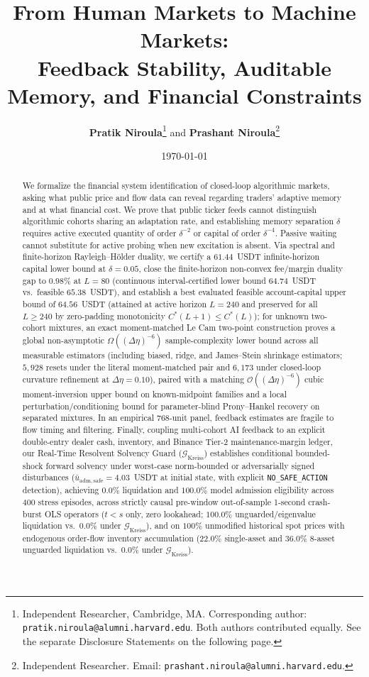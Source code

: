 \documentclass[12pt]{article}
\title{\textbf{From Human Markets to Machine Markets:}\\[0.3em]
\Large Feedback Stability, Auditable Memory, and Financial Constraints}
\author{\textbf{Pratik Niroula}\thanks{Independent Researcher, Cambridge, MA. Corresponding author: \texttt{pratik.niroula@alumni.harvard.edu}. Both authors contributed equally. See the separate Disclosure Statements on the following page.} \quad and \quad \textbf{Prashant Niroula}\thanks{Independent Researcher. Email: \texttt{prashant.niroula@alumni.harvard.edu}.}}
\date{\today}
\theoremstyle{definition}
\theoremstyle{remark}
\begin{document}
\maketitle
\thispagestyle{empty}

\vspace{-0.5em}
\begin{abstract}
\noindent We formalize the financial system identification of closed-loop algorithmic markets, asking what public price and flow data can reveal regarding traders' adaptive memory and at what financial cost. We prove that public ticker feeds cannot distinguish algorithmic cohorts sharing an adaptation rate, and establishing memory separation $\delta$ requires active executed quantity of order $\delta^{-2}$ or capital of order $\delta^{-4}$. Passive waiting cannot substitute for active probing when new excitation is absent. Via spectral and finite-horizon Rayleigh--H\"older duality, we certify a $61.44$~USDT infinite-horizon capital lower bound at $\delta=0.05$, close the finite-horizon non-convex fee/margin duality gap to $0.98\%$ at $L=80$ (continuous interval-certified lower bound $64.74$~USDT vs.\ feasible $65.38$~USDT), and establish a best evaluated feasible account-capital upper bound of $64.56$~USDT (attained at active horizon $L=240$ and preserved for all $L \ge 240$ by zero-padding monotonicity $C^*(L+1) \le C^*(L)$); for unknown two-cohort mixtures, an exact moment-matched Le Cam two-point construction proves a global non-asymptotic $\Omega((\Delta\eta)^{-6})$ sample-complexity lower bound across all measurable estimators (including biased, ridge, and James--Stein shrinkage estimators; $5{,}928$ resets under the literal moment-matched pair and $6{,}173$ under closed-loop curvature refinement at $\Delta\eta=0.10$), paired with a matching $\mathcal{O}((\Delta\eta)^{-6})$ cubic moment-inversion upper bound on known-midpoint families and a local perturbation/conditioning bound for parameter-blind Prony--Hankel recovery on separated mixtures. In an empirical 768-unit panel, feedback estimates are fragile to flow timing and filtering. Finally, coupling multi-cohort AI feedback to an explicit double-entry dealer cash, inventory, and Binance Tier-2 maintenance-margin ledger, our Real-Time Resolvent Solvency Guard ($\mathcal{G}_{\mathrm{Kreiss}}$) establishes conditional bounded-shock forward solvency under worst-case norm-bounded or adversarially signed disturbances ($\bar{u}_{\mathrm{adm,safe}} = 4.03$~USDT at initial state, with explicit \texttt{NO\_SAFE\_ACTION} detection), achieving $0.0\%$ liquidation and $100.0\%$ model admission eligibility across $400$ stress episodes, across strictly causal pre-window out-of-sample 1-second crash-burst OLS operators ($t<s$ only, zero lookahead; $100.0\%$ unguarded/eigenvalue liquidation vs.\ $0.0\%$ under $\mathcal{G}_{\mathrm{Kreiss}}$), and on $100\%$ unmodified historical spot prices with endogenous order-flow inventory accumulation ($22.0\%$ single-asset and $36.0\%$ 8-asset unguarded liquidation vs.\ $0.0\%$ under $\mathcal{G}_{\mathrm{Kreiss}}$).
\end{abstract}
\end{document}
